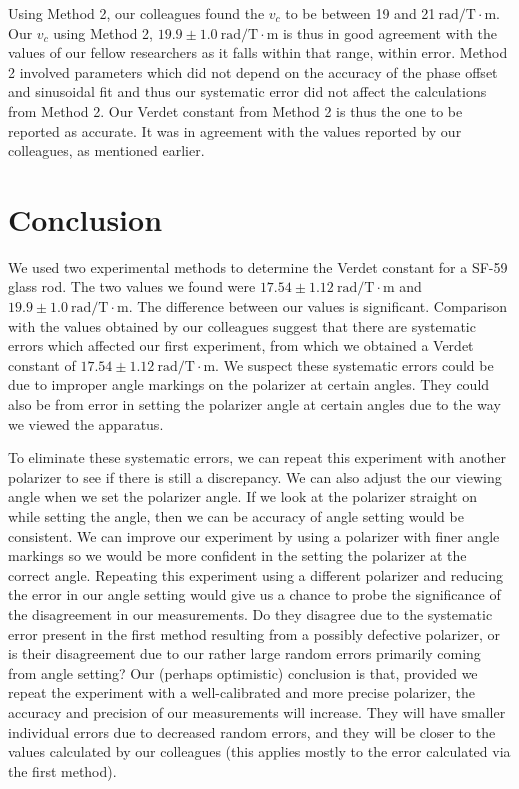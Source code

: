\documentclass[prb,preprint]{revtex4-1}
\begin{document}
{{Using Method 2, our colleagues found the $v_c$ to be between 19 and 21$\mathrm{~rad/T} \cdot \textrm{m}$.  Our $v_c$ using Method 2, $19.9 \pm 1.0 \mathrm{~rad/T} \cdot \textrm{m}$ is thus in good agreement with the values of our fellow researchers as it falls within that range, within error. 
Method 2 involved parameters which did not depend on the accuracy of the phase offset and sinusoidal fit and thus our systematic error did not affect the calculations from Method 2.  Our Verdet constant from Method 2 is thus the one to be reported as accurate.  
It was in agreement with the values reported by our colleagues, as mentioned earlier.}

\section{Conclusion}
We used two experimental methods to determine the Verdet constant for a SF-59 glass rod. The two values we found were $17.54 \pm 1.12 \mathrm{~rad/T} \cdot \textrm{m}$ and $19.9 \pm 1.0 \mathrm{~rad/T} \cdot \textrm{m}$. 
The difference between our values is significant. Comparison with the values obtained by our colleagues suggest that there are systematic errors which affected our first experiment, from which we obtained a Verdet constant of $17.54 \pm 1.12 \mathrm{~rad/T} \cdot \textrm{m}$. 
We suspect these systematic errors could be due to improper angle markings on the polarizer at certain angles. They could also be from error in setting the polarizer angle at certain angles due to the way we viewed the apparatus.

To eliminate these systematic errors, we can repeat this experiment with another polarizer to see if there is  still a discrepancy. 
We can also adjust the our viewing angle when we set the polarizer angle. If we look at the polarizer straight on while setting the angle, then we can be accuracy of angle setting would be consistent.
We can improve our experiment by using a polarizer with finer angle markings so we would be more confident in the setting the polarizer at the correct angle. 
Repeating this experiment using a different polarizer and reducing the error in our angle setting would give us a chance to probe the significance of the disagreement in our measurements.  
Do they disagree due to the systematic error present in the first method resulting from a possibly defective polarizer, or is their disagreement due to our rather large random errors primarily coming from angle setting? 
Our (perhaps optimistic) conclusion is that, provided we repeat the experiment with a well-calibrated and more precise polarizer, the accuracy and precision of our measurements will increase.  
They will have smaller individual errors due to decreased random errors, and they will be closer to the values calculated by our colleagues (this applies mostly to the error calculated via the first method).

}
\end{document}
